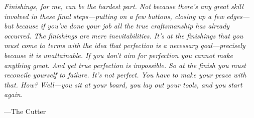 \cleardoublepage
\thispagestyle{empty}

\vspace*{\fill}
\begin{adjustwidth}{1in}{1in}
  \textit{Finishings, for me, can be the hardest part.
          Not because there's any great skill involved in these final
          steps---putting on a few buttons, closing up a few edges---but
          because if you've done your job all the true craftsmanship has
          already occurred. The finishings are mere inevitabilities.
          It's at the finishings that you must come to terms with the
          idea that perfection is a necessary goal---precisely because it
          is unattainable. If you don't aim for perfection you cannot make
          anything great. And yet true perfection is impossible.
          So at the finish you must reconcile yourself to failure.
          It's not perfect. You have to make your peace with that.
          How? Well---you sit at your board, you lay out your tools,
          and you start again.}
\end{adjustwidth}
\hspace{10.1cm}---The Cutter
\vspace*{\fill}

\restoregeometry
\doublespace
